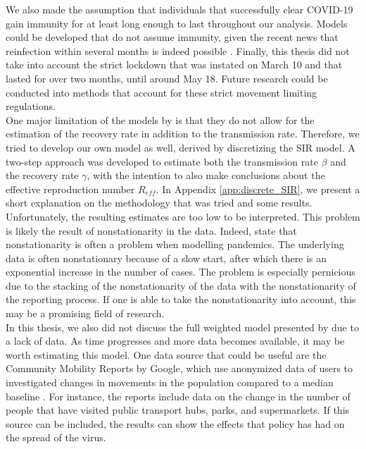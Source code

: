 \documentclass[12pt]{article}
\begin{document}
	We also made the assumption that individuals that successfully clear COVID-19 gain immunity for at least long enough to last throughout our analysis. Models could be developed that do not assume immunity, given the recent news that reinfection within several months is indeed possible \parencite{bloomberg2020reinfection}. Finally, this thesis did not take into account the strict lockdown that was instated on March 10 and that lasted for over two months, until around May 18. Future research could be conducted into methods that account for these strict movement limiting regulations. \\
	
	One major limitation of the models by \textcite{adda2016economic} is that they do not allow for the estimation of the recovery rate in addition to the transmission rate. Therefore, we tried to develop our own model as well, derived by discretizing the SIR model. A two-step approach was developed to estimate both the transmission rate $\beta$ and the recovery rate $\gamma$, with the intention to also make conclusions about the effective reproduction number $R_{eff}$. In Appendix \ref{app:discrete_SIR}, we present a short explanation on the methodology that was tried and some results. Unfortunately, the resulting estimates are too low to be interpreted. This problem is likely the result of nonstationarity in the data. Indeed, \textcite{castle2020nonstationarity} state that nonstationarity is often a problem when modelling pandemics. The underlying data is often nonstationary because of a slow start, after which there is an exponential increase in the number of cases. The problem is especially pernicious due to the stacking of the nonstationarity of the data with the nonstationarity of the reporting process. If one is able to take the nonstationarity into account, this may be a promising field of research. \\
	
	In this thesis, we also did not discuss the full weighted model presented by \textcite{adda2016economic} due to a lack of data. As time progresses and more data becomes available, it may be worth estimating this model. One data source that could be useful are the Community Mobility Reports by Google, which use anonymized data of users to investigated changes in movements in the population compared to a median baseline \parencite{google_mobility_report}. For instance, the reports include data on the change in the number of people that have visited public transport hubs, parks, and supermarkets. If this source can be included, the results can show the effects that policy has had on the spread of the virus. \\
	
\end{document}
